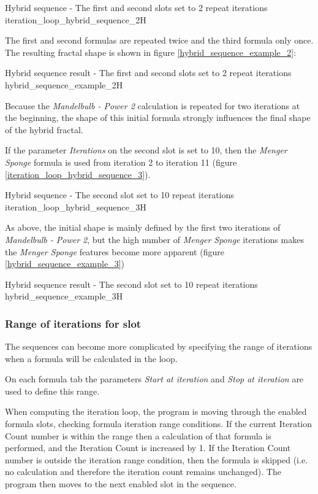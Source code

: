 {Hybrid sequence - The first and second slots set to 2 repeat iterations}
{iteration_loop_hybrid_sequence_2}{H}

The first and second formulas are repeated twice and the third formula only once.
The resulting fractal shape is shown in figure \ref{hybrid_sequence_example_2}:

{Hybrid sequence result - The first and second slots set to 2 repeat iterations}
{hybrid_sequence_example_2}{H}

Because the \emph{Mandelbulb - Power 2} calculation is repeated for two iterations at the beginning, the shape of this initial formula strongly influences the final shape of the hybrid fractal.

If the parameter \emph{Iterations} on the second slot is set to 10,
then the \emph{Menger Sponge} formula is used from iteration 2 to iteration 11 (figure \ref{iteration_loop_hybrid_sequence_3}).

{Hybrid sequence - The second slot set to 10 repeat iterations}
{iteration_loop_hybrid_sequence_3}{H}

As above, the initial shape is mainly defined by the first two iterations of \emph{Mandelbulb - Power 2},
but the high number of \emph{Menger Sponge} iterations makes the \emph{Menger Sponge} features become more apparent (figure \ref{hybrid_sequence_example_3})

{Hybrid sequence result - The second slot set to 10 repeat iterations}
{hybrid_sequence_example_3}{H}

\subsubsection{Range of iterations for slot}

The sequences can become more complicated by specifying the range of iterations when a formula will be calculated in the loop.

On each formula tab the parameters \emph{Start at iteration} and \emph{Stop at iteration} are used to define this range.

When computing the iteration loop, the program is moving through the enabled formula slots, checking formula iteration range conditions. If the current Iteration Count number is within the range then a calculation of that formula is performed, and the Iteration Count is increased by 1. If the Iteration Count number is outside the iteration range condition, then the formula is skipped (i.e. no calculation and therefore the iteration count remains unchanged). The program then moves to the next enabled slot in the sequence.


